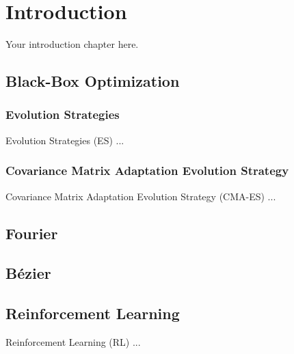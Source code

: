 
\chapter{Introduction}
\label{ch:introduction}

Your introduction chapter here.

\section{Black-Box Optimization}
\subsection{Evolution Strategies}
Evolution Strategies (ES) ...

\subsection{Covariance Matrix Adaptation Evolution Strategy}
Covariance Matrix Adaptation Evolution Strategy (CMA-ES) ...

\section{Fourier}

\section{Bézier}


\section{Reinforcement Learning}
Reinforcement Learning (RL) ...





